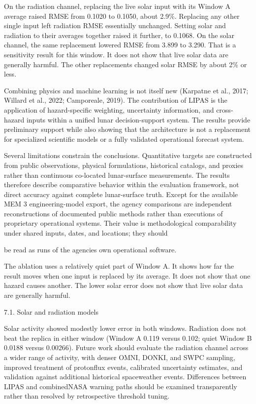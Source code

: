 On the radiation channel, replacing the live solar input with its Window A average raised RMSE from 0.1020 to 0.1050, about 2.9\%. Replacing any other single input left radiation RMSE essentially unchanged. Setting solar and radiation to their averages together raised it further, to 0.1068. On the solar channel, the same replacement lowered RMSE from 3.899 to 3.290. That is a sensitivity result for this window. It does not show that live solar data are generally harmful. The other replacements changed solar RMSE by about 2\% or less.

Combining physics and machine learning is not itself new (Karpatne et al., 2017; Willard et al., 2022; Camporeale, 2019). The contribution of LIPAS is the application of hazard-specific weighting, uncertainty information, and cross-hazard inputs within a unified lunar decision-support system. The results provide preliminary support while also showing that the architecture is not a replacement for specialized scientific models or a fully validated operational forecast system.

Several limitations constrain the conclusions. Quantitative targets are constructed from public observations, physical formulations, historical catalogs, and proxies rather than continuous co-located lunar-surface measurements. The results therefore describe comparative behavior within the evaluation framework, not direct accuracy against complete lunar-surface truth. Except for the available MEM 3 engineering-model export, the agency comparisons are independent reconstructions of documented public methods rather than executions of proprietary operational systems. Their value is methodological comparability under shared inputs, dates, and locations; they should

be read as runs of the agencies\textquotesingle{} own operational software.

The ablation uses a relatively quiet part of Window A. It shows how far the result moves when one input is replaced by its average. It does not show that one hazard causes another. The lower solar error does not show that live solar data are generally harmful.

7.1. Solar and radiation models

Solar activity showed modestly lower error in both windows. Radiation does not beat the replica in either window (Window A 0.119 versus 0.102; quiet Window B 0.0188 versus 0.00266). Future work should evaluate the radiation channel across a wider range of activity, with denser OMNI, DONKI, and SWPC sampling, improved treatment of protonflux events, calibrated uncertainty estimates, and validation against additional historical spaceweather events. Differences between LIPAS and combinedNASA warning paths should be examined transparently rather than resolved by retrospective threshold tuning.

